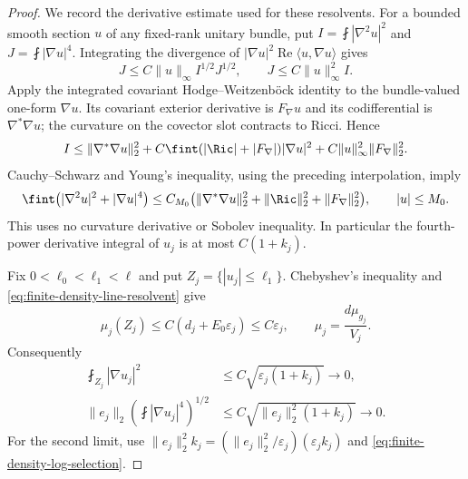 \begin{proof}
We record the derivative estimate used for these resolvents.  For a
bounded smooth section $u$ of any fixed-rank unitary bundle, put
$I=\fint|\nabla^2u|^2$ and $J=\fint|\nabla u|^4$.
Integrating the divergence of
$|\nabla u|^2\operatorname{Re}\langle u,\nabla u\rangle$ gives
\[
 J\le C\|u\|_\infty I^{1/2}J^{1/2},\qquad
 J\le C\|u\|_\infty^2 I.
\]
Apply the integrated covariant Hodge--Weitzenb\"ock identity to the
bundle-valued one-form $\nabla u$.  Its covariant exterior derivative
is $F_\nabla u$ and its codifferential is $\nabla^*\nabla u$;
the curvature on the covector slot contracts to Ricci.  Hence
\[
 I\le\|\nabla^*\nabla u\|_2^2
   +C\fint(|\Ric|+|F_\nabla|)|\nabla u|^2
   +C\|u\|_\infty^2\|F_\nabla\|_2^2.
\]
Cauchy--Schwarz and Young's inequality, using the preceding
interpolation, imply
\begin{equation}
 \fint\bigl(|\nabla^2u|^2+|\nabla u|^4\bigr)
 \le C_{M_0}\bigl(
 \|\nabla^*\nabla u\|_2^2+
 \|\Ric\|_2^2+\|F_\nabla\|_2^2\bigr),
 \qquad |u|\le M_0.
 \label{eq:finite-density-hessian-interchange}
\end{equation}
This uses no curvature derivative or Sobolev inequality.  In
particular the fourth-power derivative integral of $u_j$ is at most
$C(1+k_j)$.

Fix $0<\ell_0<\ell_1<\ell$ and put
$Z_j=\{|u_j|\le\ell_1\}$.  Chebyshev's inequality and
\eqref{eq:finite-density-line-resolvent} give
\[
 \mu_j(Z_j)\le C(d_j+E_0\varepsilon_j)\le C\varepsilon_j,
 \qquad \mu_j=\frac{d\mu_{g_j}}{V_j}.
\]
Consequently
\begin{align}
 \fint_{Z_j}|\nabla u_j|^2
 &\le C\sqrt{\varepsilon_j(1+k_j)}\longrightarrow0,
 \label{eq:finite-density-transition-energy}\\
 \|e_j\|_2\left(\fint|\nabla u_j|^4\right)^{1/2}
 &\le C\sqrt{\|e_j\|_2^2(1+k_j)}\longrightarrow0.
 \label{eq:finite-density-transition-error}
\end{align}
For the second limit, use
$\|e_j\|_2^2k_j=(\|e_j\|_2^2/\varepsilon_j)
(\varepsilon_jk_j)$ and \eqref{eq:finite-density-log-selection}.


\end{proof}

